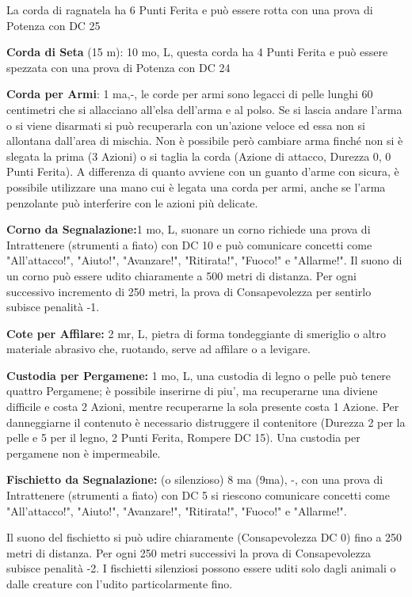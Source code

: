 \documentclass[a4paper,11pt,twoside,openany]{book}
\begin{document}
La corda di ragnatela ha 6 Punti Ferita e può essere rotta con una prova di Potenza con DC 25

\textbf{Corda di Seta} (15 m): 10 mo, L, questa corda ha 4 Punti Ferita e può essere spezzata con una prova di Potenza con DC 24

\textbf{Corda per Armi}: 1 ma,-, le corde per armi sono legacci di pelle lunghi 60 centimetri che si allacciano all’elsa dell’arma e al polso. Se si lascia andare l’arma o si viene disarmati si può recuperarla con un’azione veloce ed essa non si allontana dall’area di mischia. Non è possibile però cambiare arma finché non si è slegata la prima (3 Azioni) o si taglia la corda (Azione di attacco, Durezza 0, 0 Punti Ferita). A differenza di quanto avviene con un guanto d’arme con sicura, è possibile utilizzare una mano cui è legata una corda per armi, anche se l’arma penzolante può interferire con le azioni più delicate.

\textbf{Corno da Segnalazione:}1 mo, L, suonare un corno richiede una prova di Intrattenere (strumenti a fiato) con DC 10 e può comunicare concetti come "All'attacco!", "Aiuto!", "Avanzare!", "Ritirata!", "Fuoco!" e "Allarme!". Il suono di un corno può essere udito chiaramente a 500 metri di distanza. Per ogni successivo incremento di 250 metri, la prova di Consapevolezza per sentirlo subisce penalità -1.

\textbf{Cote per Affilare:} 2 mr, L, pietra di forma tondeggiante di smeriglio o altro materiale abrasivo che, ruotando, serve ad affilare o a levigare.

\textbf{Custodia per Pergamene:} 1 mo, L, una custodia di legno o pelle può tenere quattro Pergamene; è possibile inserirne di piu', ma recuperarne una diviene difficile e costa 2 Azioni, mentre recuperarne la sola presente costa 1 Azione. Per danneggiarne il contenuto è necessario distruggere il contenitore (Durezza 2 per la pelle e 5 per il legno, 2 Punti Ferita, Rompere DC 15). Una custodia per pergamene non è impermeabile.

\textbf{Fischietto da Segnalazione:} (o silenzioso) 8 ma (9ma), -, con una prova di Intrattenere (strumenti a fiato) con DC 5 si riescono comunicare concetti come "All'attacco!", "Aiuto!", "Avanzare!", "Ritirata!", "Fuoco!" e "Allarme!".

Il suono del fischietto si può udire chiaramente (Consapevolezza DC 0) fino a 250 metri di distanza. Per ogni 250 metri successivi la prova di Consapevolezza subisce penalità -2. I fischietti silenziosi possono essere uditi solo dagli animali o dalle creature con l'udito particolarmente fino.
\end{document}
